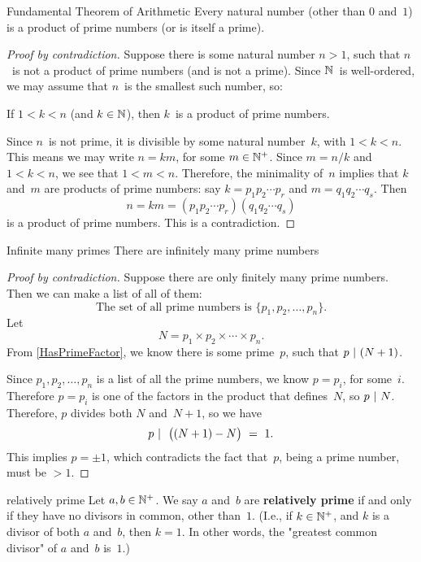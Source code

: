 \documentclass[../MATH-2000-Notes.tex]{subfiles}
\begin{document}
\begin{Theorem}{Fundamental Theorem of Arithmetic}
    Every natural number \textup(other than $0$ and~$1$\textup) is a product of prime numbers \textup(or is itself a prime\textup).
\end{Theorem}
    
\begin{proof}[Proof by contradiction]
    Suppose there is some natural number $n > 1$, such that $n$~is not a product of prime numbers (and is not a prime). Since $\mathbb{N}$~is well-ordered, we may assume that $n$~is the smallest such number, so:
    
    If $1 < k < n$ (and $k \in \mathbb{N}$), then $k$~is a product of prime numbers.
    
    Since $n$~is not prime, it is divisible by some natural number~$k$, with $1 < k < n$. This means we may write $n = km$, for some $m \in \mathbb{N}^+$. Since $m = n/k$ and $1 < k < n$, we see that $1 < m < n$. Therefore, the minimality of~$n$ implies that $k$ and~$m$ are products of prime numbers: say $k = p_1 p_2 \cdots p_r$ and $m = q_1 q_2 \cdots q_s$. Then
        $$ n = km = (p_1 p_2 \cdots p_r)(q_1 q_2 \cdots q_s) $$
    is a product of prime numbers. This is a contradiction.
\end{proof}


\begin{Corollary}
    {Infinite many primes}
    There are infinitely many prime numbers
\end{Corollary}


\begin{proof}[Proof by contradiction]
    Suppose there are only finitely many prime numbers. Then we can make a list of all of them: 
        $$ \text{The set of all prime numbers is $\{p_1,p_2,\ldots,p_n\}$.} $$
    Let 
        $$ N = p_1\times p_2 \times \cdots \times p_n .$$
    From \ref{HasPrimeFactor}, we know there is some prime~$p$, such that $p \ |\  (N+1)$. 
    
    Since $p_1,p_2,\ldots,p_n$ is a list of all the prime numbers, we know $p = p_i$, for some~$i$. Therefore $p = p_i$ is one of the factors in the product that defines~$N$, so $p \ |\  N$. Therefore, $p$ divides both $N$ and~$N+1$, so we have
        $$ p \ |\  \ \bigl( (N+1) - N\bigr) \ = \ 1 .$$
    This implies $p = \pm 1$, which contradicts the fact that~$p$, being a prime number, must be $> 1$.
\end{proof}


\begin{Definition}
    {relatively prime}
    Let $a,b \in \mathbb{N}^+$. We say $a$ and~$b$ are \textbf{relatively prime} if and only if they have no divisors in common, other than~$1$. (I.e., if $k \in  \mathbb{N}^+$, and $k$ is a divisor of both $a$ and~$b$, then $k = 1$. In other words, the "greatest common divisor" of $a$ and~$b$ is~$1$.)
\end{Definition}
\end{document}
